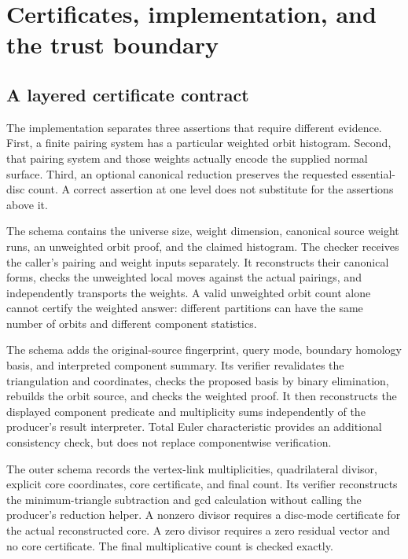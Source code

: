 \section{Certificates, implementation, and the trust boundary}
\label{sec:certificates}

\subsection{A layered certificate contract}

The implementation separates three assertions that require different evidence.
First, a finite pairing system has a particular weighted orbit histogram.
Second, that pairing system and those weights actually encode the supplied
normal surface. Third, an optional canonical reduction preserves the requested
essential-disc count. A correct assertion at one level does not substitute for
the assertions above it.

The schema  contains the universe size,
weight dimension, canonical source weight runs, an unweighted orbit proof,
and the claimed histogram. The checker receives the caller's pairing and
weight inputs separately. It reconstructs their canonical forms, checks the
unweighted local moves against the actual pairings, and independently
transports the weights. A valid unweighted orbit count alone cannot certify
the weighted answer: different partitions can have the same number of orbits
and different component statistics.

The schema  adds the original-source
fingerprint, query mode, boundary homology basis, and interpreted component
summary. Its verifier revalidates the triangulation and coordinates, checks
the proposed basis by binary elimination, rebuilds the orbit source, and
checks the weighted proof. It then reconstructs the displayed component
predicate and multiplicity sums independently of the producer's result
interpreter. Total Euler characteristic provides an additional consistency
check, but does not replace componentwise verification.

The outer schema  records the vertex-link
multiplicities, quadrilateral divisor, explicit core coordinates, core
certificate, and final count. Its verifier reconstructs the minimum-triangle
subtraction and gcd calculation without calling the producer's reduction
helper. A nonzero divisor requires a disc-mode certificate for the actual
reconstructed core. A zero divisor requires a zero residual vector and no
core certificate. The final multiplicative count is checked exactly.

